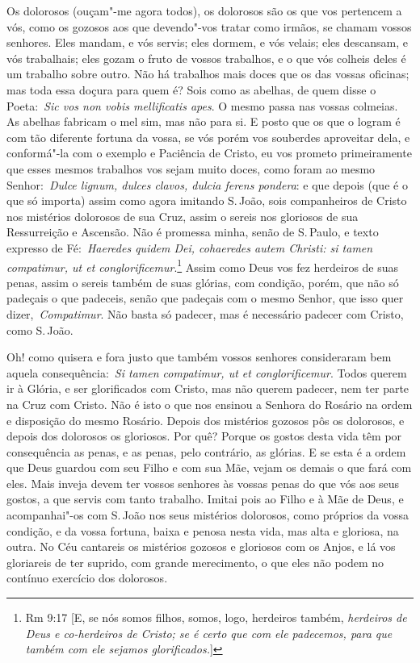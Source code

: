 Os dolorosos (ouçam"-me agora todos), os dolorosos são os
que vos pertencem a vós, como os gozosos aos que devendo"-vos tratar como
irmãos, se chamam vossos senhores. Eles mandam, e vós servis; eles
dormem, e vós velais; eles descansam, e vós trabalhais; eles gozam o
fruto de vossos trabalhos, e o que vós colheis deles é um trabalho sobre
outro. Não há trabalhos mais doces que os das vossas oficinas; mas toda
essa doçura para quem é? Sois como as abelhas, de quem disse o
Poeta:~\emph{Sic vos non vobis mellificatis apes}. O
mesmo passa nas vossas colmeias. As abelhas fabricam o mel sim, mas não
para si. E posto que os que o logram é com tão diferente fortuna da
vossa, se vós porém vos souberdes aproveitar dela, e conformá"-la com o
exemplo e Paciência de Cristo, eu vos prometo primeiramente que esses
mesmos trabalhos vos sejam muito doces, como foram ao mesmo
Senhor:~\emph{Dulce lignum, dulces clavos, dulcia ferens pondera}: e que
depois (que é o que só importa) assim como agora imitando S.\,João, sois
companheiros de Cristo nos mistérios dolorosos de sua Cruz, assim o
sereis nos gloriosos de sua Ressurreição e Ascensão. Não é promessa
minha, senão de S.\,Paulo, e texto expresso de Fé:~\emph{Haeredes quidem
Dei, cohaeredes autem Christi: si tamen compatimur, ut et
conglorificemur}.\footnote{Rm 9:17 [E, se nós somos filhos, somos, logo, herdeiros também, \textit{herdeiros de Deus e co-herdeiros de Cristo; se é certo que com ele padecemos, para que também com ele sejamos glorificados.}]} Assim como Deus vos fez herdeiros de
suas penas, assim o sereis também de suas glórias, com condição, porém,
que não só padeçais o que padeceis, senão que padeçais com o mesmo
Senhor, que isso quer dizer,~\emph{Compatimur}. Não basta só padecer,
mas é necessário padecer com Cristo, como S.\,João.


Oh! como quisera e fora justo que também vossos senhores
consideraram bem aquela consequência:~\emph{Si tamen compatimur, ut et
conglorificemur}. Todos querem ir à Glória, e ser glorificados com
Cristo, mas não querem padecer, nem ter parte na Cruz com Cristo. Não é
isto o que nos ensinou a Senhora do Rosário na ordem e disposição do
mesmo Rosário. Depois dos mistérios gozosos pôs os dolorosos, e depois
dos dolorosos os gloriosos. Por quê? Porque os gostos desta vida têm por
consequência as penas, e as penas, pelo contrário, as glórias. E se esta
é a ordem que Deus guardou com seu Filho e com sua Mãe, vejam os demais
o que fará com eles. Mais inveja devem ter vossos senhores às vossas
penas do que vós aos seus gostos, a que servis com tanto trabalho.
Imitai pois ao Filho e à Mãe de Deus, e acompanhai"-os com S.\,João nos
seus mistérios dolorosos, como próprios da vossa condição, e da vossa
fortuna, baixa e penosa nesta vida, mas alta e gloriosa, na outra. No
Céu cantareis os mistérios gozosos e gloriosos com os Anjos, e lá vos
gloriareis de ter suprido, com grande merecimento, o que eles não podem
no contínuo exercício dos dolorosos.

